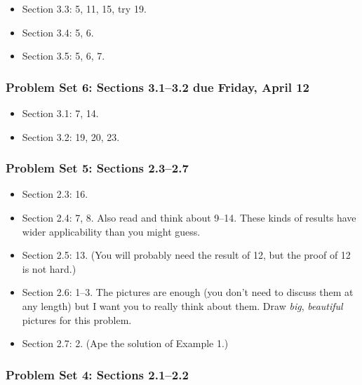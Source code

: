 \begin{itemize}
\item Section 3.3: 5, 11, 15, try 19.

\item Section 3.4: 5, 6.

\item Section 3.5: 5, 6, 7.

\end{itemize}

\subsubsection{Problem Set 6: Sections 3.1--3.2  due Friday, April 12}
\label{problemset6:sections3.1--3.2brduefridayapril12}

\begin{itemize}
\item Section 3.1: 7, 14.

\item Section 3.2: 19, 20, 23.

\end{itemize}

\subsubsection{Problem Set 5: Sections 2.3--2.7}
\label{problemset5:sections2.3--2.7}

\begin{itemize}
\item Section 2.3: 16.

\item Section 2.4: 7, 8. Also read and think about 9--14. These kinds of results have wider applicability than you might guess.

\item Section 2.5: 13. (You will probably need the result of 12, but the proof of 12 is not hard.)

\item Section 2.6: 1--3. The pictures are enough (you don't need to discuss them at any length) but I want you to really think about them. Draw \emph{big}, \emph{beautiful} pictures for this problem.

\item Section 2.7: 2. (Ape the solution of Example 1.)

\end{itemize}

\subsubsection{Problem Set 4: Sections 2.1--2.2}
\label{problemset4:sections2.1--2.2}

